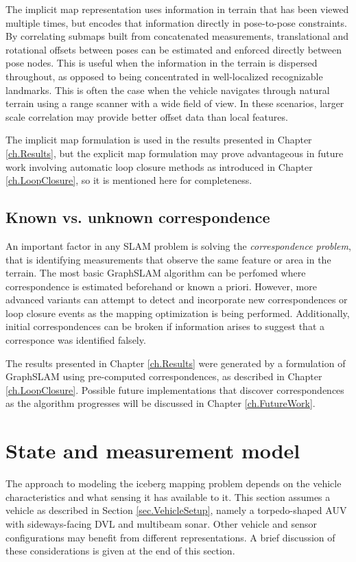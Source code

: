 The implicit map representation uses information in terrain that has been viewed multiple times, but encodes that information directly in pose-to-pose constraints. By correlating submaps built from concatenated measurements, translational and rotational offsets between poses can be estimated and enforced directly between pose nodes. This is useful when the information in the terrain is dispersed throughout, as opposed to being concentrated in well-localized recognizable landmarks. This is often the case when the vehicle navigates through natural terrain using a range scanner with a wide field of view. In these scenarios, larger scale correlation may provide better offset data than local features. 

The implicit map formulation is used in the results presented in Chapter \ref{ch.Results}, but the explicit map formulation may prove advantageous in future work involving automatic loop closure methods as introduced in Chapter \ref{ch.LoopClosure}, so it is mentioned here for completeness.

\subsection{Known vs. unknown correspondence}

An important factor in any SLAM problem is solving the \emph{correspondence problem}, that is identifying measurements that observe the same feature or area in the terrain. The most basic GraphSLAM algorithm can be perfomed where correspondence is estimated beforehand or known a priori. However, more advanced variants can attempt to detect and incorporate new correspondences or loop closure events as the mapping optimization is being performed. Additionally, initial correspondences can be broken if information arises to suggest that a corresponce was identified falsely. 

The results presented in Chapter \ref{ch.Results} were generated by a formulation of GraphSLAM using pre-computed correspondences, as described in Chapter \ref{ch.LoopClosure}. Possible future implementations that discover correspondences as the algorithm progresses will be discussed in Chapter \ref{ch.FutureWork}.

\section{State and measurement model}

The approach to modeling the iceberg mapping problem depends on the vehicle characteristics and what sensing it has available to it. This section assumes a vehicle as described in Section \ref{sec.VehicleSetup}, namely a torpedo-shaped AUV with sideways-facing DVL and multibeam sonar. Other vehicle and sensor configurations may benefit from different representations. A brief discussion of these considerations is given at the end of this section. 

